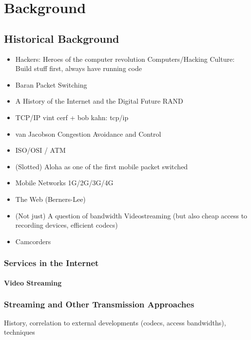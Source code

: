 \chapter{Background}
\label{chap:relatedwork}



\section{Historical Background}

\begin{itemize}
\item Hackers: Heroes of the computer revolution \cite{levy2010hackers}
		Computers/Hacking Culture: Build stuff first, always have running code
\item Baran Packet Switching
\item A History of the Internet and the Digital Future \cite{ryan2010history}
		RAND
\item TCP/IP vint cerf + bob kahn: tcp/ip \cite{1092259}
\item van Jacobson Congestion Avoidance and Control \cite{Jacobson:1995:CAC:205447.205462}
\item ISO/OSI / ATM
\item (Slotted) Aloha as one of the first mobile packet switched
\item Mobile Networks 1G/2G/3G/4G
\item The Web (Berners-Lee)
\item (Not just) A question of bandwidth Videostreaming (but also cheap access to recording devices, efficient codecs)
\item Camcorders

\end{itemize}




\subsection{Services in the Internet}

\subsubsection{Video Streaming}

\subsection{Streaming and Other Transmission Approaches}
History, correlation to external developments (codecs, access bandwidths), techniques

